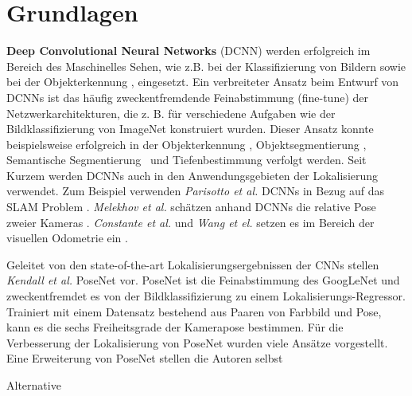\pagebreak
\section{Grundlagen}




\pagebreak
\textbf{Deep Convolutional Neural Networks} (DCNN) werden erfolgreich im Bereich des Maschinelles Sehen, wie z.B. bei der Klassifizierung von Bildern \cite{krizhevskyImageNetClassificationDeep2012, simonyanVeryDeepConvolutional2014, heDeepResidualLearning2015} sowie bei der  Objekterkennung \cite{girshickRichFeatureHierarchies2013, renFasterRCNNRealTime2015b, girshickFastRCNN2015},  eingesetzt. 
Ein verbreiteter Ansatz beim Entwurf von DCNNs ist das häufig zweckentfremdende Feinabstimmung (fine-tune) der Netzwerkarchitekturen, die z. B. für verschiedene Aufgaben wie der Bildklassifizierung von ImageNet \cite{russakovskyImageNetLargeScale2014} konstruiert wurden. Dieser Ansatz konnte beispielsweise erfolgreich in der Objekterkennung \cite{girshickFastRCNN2015}, Objektsegmentierung \cite{kokkinosPushingBoundariesBoundary2015, maninisConvolutionalOrientedBoundaries2016}, Semantische Segmentierung \cite{nohLearningDeconvolutionNetwork2015, hazirbasFuseNetIncorporatingDepth2017a} und Tiefenbestimmung \cite{liDepthSurfaceNormal2015} verfolgt werden.
Seit Kurzem werden DCNNs auch in den Anwendungsgebieten der Lokalisierung verwendet. Zum Beispiel verwenden \textit{Parisotto et al.} DCNNs in Bezug auf das SLAM Problem \cite{parisottoGlobalPoseEstimation2018}. \textit{Melekhov et al.} schätzen anhand DCNNs die relative Pose zweier Kameras \cite{melekwashovRelativeCameraPose2017}. \textit{Constante et al.} und \textit{Wang et el.} setzen es im Bereich der visuellen Odometrie ein \cite{costanteExploringRepresentationLearning2016, wangDeepVOEndtoendVisual2017}.

Geleitet von den state-of-the-art Lokalisierungsergebnissen der CNNs stellen \textit{Kendall et al.} PoseNet \cite{kendallPoseNetConvolutionalNetwork2015} vor.
PoseNet ist die Feinabstimmung des GoogLeNet \cite{szegedyGoingDeeperConvolutions2015} und zweckentfremdet es von der Bildklassifizierung zu einem Lokalisierungs-Regressor. Trainiert mit einem Datensatz bestehend aus Paaren von Farbbild und Pose, kann es die sechs Freiheitsgrade der Kamerapose bestimmen.
Für die Verbesserung der Lokalisierung von PoseNet wurden viele Ansätze vorgestellt. Eine Erweiterung von PoseNet stellen die Autoren selbst


Alternative 





% 
